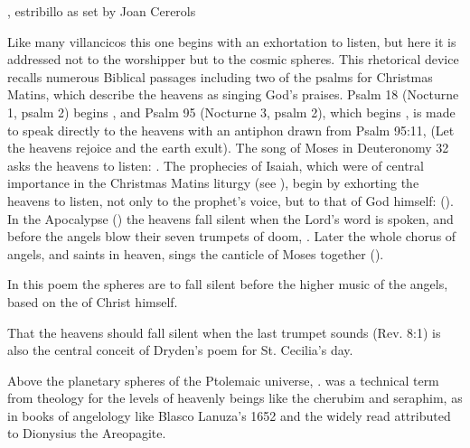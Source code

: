 
\begin{poemexample}
    \caption{, estribillo as set by Joan Cererols}
    \label{poem:Suspended_cielos-estribillo}
\end{poemexample}

Like many villancicos this one begins with an exhortation to listen, but here it
is addressed not to the worshipper but to the cosmic spheres. 
This rhetorical device recalls numerous Biblical passages including two of the
psalms for Christmas Matins, which describe the heavens as singing God's
praises.
Psalm 18 (Nocturne 1, psalm 2) begins , and Psalm 95 (Nocturne 3, psalm 2), which begins , is made to speak directly to the heavens
with an antiphon drawn from Psalm 95:11,  (Let the heavens rejoice and the earth exult).%
    \Autocite[169--179]{Catholic:Breviarium1631}
The song of Moses in Deuteronomy 32 asks the heavens to listen: . 
The prophecies of Isaiah, which were of central importance in the Christmas
Matins liturgy (see ), begin by exhorting the heavens to
listen, not only to the prophet's voice, but to that of God himself:
 ().
In the Apocalypse () the heavens fall silent when the
Lord's word is spoken, and before the angels blow their seven trumpets of
doom, .
Later the whole chorus of angels,  and saints in
heaven, sings the canticle of Moses together ().


In this poem the spheres are to fall silent before the higher music of the
angels, based on the  of Christ himself.%
\begin{Footnote}
    That the heavens should fall silent when the last trumpet sounds (Rev. 8:1)
    is also the central conceit of Dryden's poem for St. Cecilia's day. 
\end{Footnote}
Above the planetary spheres of the Ptolemaic universe, . 
 was a technical term from theology for the levels of
heavenly beings like the cherubim and seraphim, as in books of angelology like
Blasco Lanuza's 1652  and
the widely read  attributed to Dionysius the
Areopagite.%
    \Autocite[See also][, 393]{Kircher:Musurgia}

